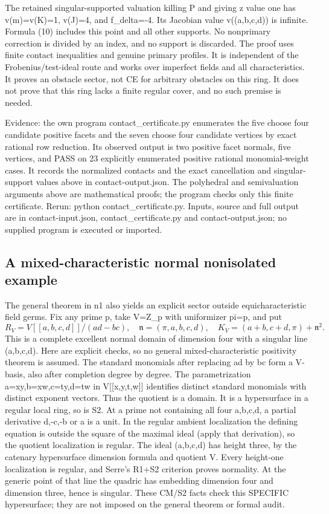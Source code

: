 \documentclass[11pt]{article}
\begin{document}
The retained singular-supported valuation killing P and giving z value one has v(m)=v(K)=1, v(J)=4, and f\_delta=-4. Its Jacobian value v((a,b,c,d)) is infinite. Formula (10) includes this point and all other supports. No nonprimary correction is divided by an index, and no support is discarded. The proof uses finite contact inequalities and genuine primary profiles. It is independent of the Frobenius/test-ideal route and works over imperfect fields and all characteristics. It proves an obstacle sector, not CE for arbitrary obstacles on this ring. It does not prove that this ring lacks a finite regular cover, and no such premise is needed.

Evidence: the own program contact\_certificate.py enumerates the five choose four candidate positive facets and the seven choose four candidate vertices by exact rational row reduction. Its observed output is two positive facet normals, five vertices, and PASS on 23 explicitly enumerated positive rational monomial-weight cases. It records the normalized contacts and the exact cancellation and singular-support values above in contact-output.json. The polyhedral and semivaluation arguments above are mathematical proofs; the program checks only this finite certificate. Rerun: python contact\_certificate.py. Inputs, source and full output are in contact-input.json, contact\_certificate.py and contact-output.json; no supplied program is executed or imported.

\subsection{A mixed-characteristic normal nonisolated example}

The general theorem in n1 also yields an explicit sector outside equicharacteristic field germs. Fix any prime p, take V=Z\_p with uniformizer pi=p, and put
\[
 R_V=V[[a,b,c,d]]/(ad-bc),\quad \mathfrak n=(\pi,a,b,c,d),\quad
 K_V=(a+b,c+d,\pi)+\mathfrak n^2.                         \tag{11}
\]
This is a complete excellent normal domain of dimension four with a singular line (a,b,c,d). Here are explicit checks, so no general mixed-characteristic positivity theorem is assumed. The standard monomials after replacing ad by bc form a V-basis, also after completion degree by degree. The parametrization a=xy,b=xw,c=ty,d=tw in V[[x,y,t,w]] identifies distinct standard monomials with distinct exponent vectors. Thus the quotient is a domain. It is a hypersurface in a regular local ring, so is S2. At a prime not containing all four a,b,c,d, a partial derivative d,-c,-b or a is a unit. In the regular ambient localization the defining equation is outside the square of the maximal ideal (apply that derivation), so the quotient localization is regular. The ideal (a,b,c,d) has height three, by the catenary hypersurface dimension formula and quotient V. Every height-one localization is regular, and Serre's R1+S2 criterion proves normality. At the generic point of that line the quadric has embedding dimension four and dimension three, hence is singular. These CM/S2 facts check this SPECIFIC hypersurface; they are not imposed on the general theorem or formal audit.
\end{document}
